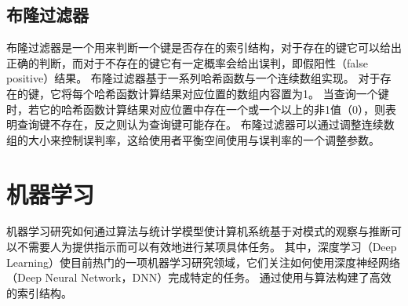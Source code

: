 \subsection{布隆过滤器}

布隆过滤器是一个用来判断一个键是否存在的索引结构，对于存在的键它可以给出正确的判断，而对于不存在的键它有一定概率会给出误判，即假阳性（false positive）结果。
布隆过滤器基于一系列哈希函数与一个连续数组实现。
对于存在的键，它将每个哈希函数计算结果对应位置的数组内容置为1。
当查询一个键时，若它的哈希函数计算结果对应位置中存在一个或一个以上的非1值（0），则表明查询键不存在，反之则认为查询键可能存在。
布隆过滤器可以通过调整连续数组的大小来控制误判率，这给使用者平衡空间使用与误判率的一个调整参数。




\section{机器学习}

机器学习研究如何通过算法与统计学模型使计算机系统基于对模式的观察与推断可以不需要人为提供指示而可以有效地进行某项具体任务。
其中，深度学习（Deep Learning）使目前热门的一项机器学习研究领域，它们关注如何使用深度神经网络（Deep Neural Network，DNN）完成特定的任务。
{\li}通过使用{\model}与算法构建了高效的索引结构。


